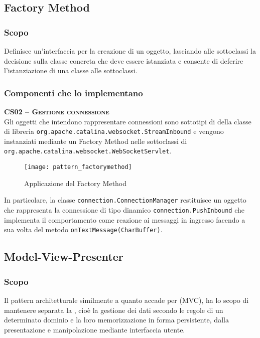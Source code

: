 \subsection{Factory Method}\label{sec:patternfactorymethod}

\subsubsection{Scopo}
Definisce un'interfaccia per la creazione di un oggetto, lasciando alle sottoclassi la decisione sulla classe concreta che deve essere istanziata e consente di deferire l'istanziazione di una classe alle sottoclassi.

\subsubsection{Componenti che lo implementano}
\begin{description}

  \item{\scshape\bfseries CS02 -- Gestione connessione}\\
Gli oggetti che intendono rappresentare connessioni sono sottotipi di della classe di libreria \texttt{org.apache.catalina.websocket.StreamInbound} e vengono instanziati mediante un Factory Method nelle sottoclassi di \texttt{org.apache.catalina.websocket.WebSocketServlet}.

\begin{figure}[H]
  \centering
  \texttt{[image: pattern\_factorymethod]}
  \caption{Applicazione del  Factory Method}\label{fig:factory_method}
\end{figure}

In particolare, la classe \texttt{connection.ConnectionManager} restituisce un oggetto che rappresenta la connessione di tipo dinamico \texttt{connection.PushInbound} che implementa il comportamento come reazione ai messaggi in ingresso facendo a sua volta  del metodo \texttt{onTextMessage(CharBuffer)}.
\end{description}

\subsection{Model-View-Presenter}\label{sec:MVP}

\subsubsection{Scopo}
Il pattern architetturale  similmente a quanto accade per  (MVC), ha lo scopo di mantenere separata la , cioè la gestione dei dati secondo le regole di un determinato dominio e la loro memorizzazione in forma persistente, dalla presentazione e manipolazione mediante interfaccia utente.


